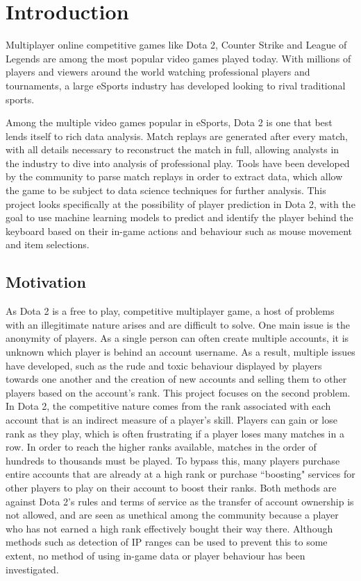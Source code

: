 \documentclass[Report.tex]{subfiles}
\begin{document}
\section{Introduction}
Multiplayer online competitive games like Dota 2, Counter Strike and League of Legends are among the most popular video games played today. With millions of players and viewers around the world watching professional players and tournaments, a large eSports industry has developed looking to rival traditional sports. 

Among the multiple video games popular in eSports, Dota 2 is one that best lends itself to rich data analysis. Match replays are generated after every match, with all details necessary to reconstruct the match in full, allowing analysts in the industry to dive into analysis of professional play. Tools have been developed by the community to parse match replays in order to extract data, which allow the game to be subject to data science techniques for further analysis. This project looks specifically at the possibility of player prediction in Dota 2, with the goal to use machine learning models to predict and identify the player behind the keyboard based on their in-game actions and behaviour such as mouse movement and item selections. 

\subsection{Motivation}
As Dota 2 is a free to play, competitive multiplayer game, a host of problems with an illegitimate nature arises and are difficult to solve. One main issue is the anonymity of players. As a single person can often create multiple accounts, it is unknown which player is behind an account username. As a result, multiple issues have developed, such as the rude and toxic behaviour displayed by players towards one another \cite{toxic} and the creation of new accounts and selling them to other players based on the account's rank. This project focuses on the second problem. In Dota 2, the competitive nature comes from the rank associated with each account that is an indirect measure of a player's skill. Players can gain or lose rank as they play, which is often frustrating if a player loses many matches in a row. In order to reach the higher ranks available, matches in the order of hundreds to thousands must be played. To bypass this, many players purchase entire accounts that are already at a high rank or purchase ``boosting" services for other players to play on their account to boost their ranks. Both methods are against Dota 2's rules and terms of service \cite{steam-tos} as the transfer of account ownership is not allowed, and are seen as unethical among the community because a player who has not earned a high rank effectively bought their way there. Although methods such as detection of IP ranges can be used to prevent this to some extent, no method of using in-game data or player behaviour has been investigated. 
\end{document}
